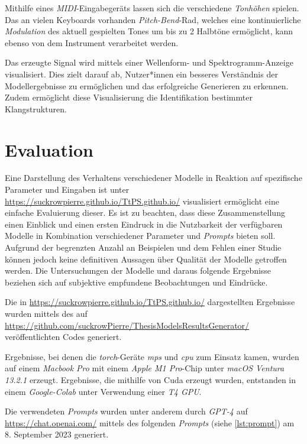 \documentclass[
  a4paper,  %
  twoside,  %
  bibliography=totoc,
  headsepline,
  cleardoublepage=empty,
  parskip=half,
  draft=false
]{scrbook}
\begin{document}
Mithilfe eines \emph{MIDI}-Eingabegeräts lassen sich die verschiedene \emph{Tonhöhen} spielen. Das an vielen Keyboards vorhanden \emph{Pitch-Bend}-Rad, welches eine kontinuierliche \emph{Modulation} des aktuell gespielten Tones um bis zu 2 Halbtöne ermöglicht, kann ebenso von dem Instrument verarbeitet werden. 

Das erzeugte Signal wird mittels einer Wellenform- und Spektrogramm-Anzeige visualisiert. Dies zielt darauf ab, Nutzer*innen ein besseres Verständnis der Modellergebnisse zu ermöglichen und das erfolgreiche Generieren zu erkennen. Zudem ermöglicht diese Visualisierung die Identifikation bestimmter Klangstrukturen.


\section{Evaluation}

Eine Darstellung des Verhaltens verschiedener Modelle in Reaktion auf spezifische Parameter und Eingaben ist unter \url{https://suckrowpierre.github.io/TtPS.github.io/} \cite{pierre-louis_suckrow_text-zu-spielbarem-klang_nodate} visualisiert ermöglicht eine einfache Evaluierung dieser. Es ist zu beachten, dass diese Zusammenstellung einen Einblick und einen ersten Eindruck in die Nutzbarkeit der verfügbaren Modelle in Kombination verschiedener Parameter und \emph{Prompts} bieten soll. Aufgrund der begrenzten Anzahl an Beispielen und dem Fehlen einer Studie können jedoch keine definitiven Aussagen über Qualität der Modelle getroffen werden. Die Untersuchungen der Modelle und daraus folgende Ergebnisse beziehen sich auf subjektive empfundene Beobachtungen und Eindrücke.  

Die in \url{https://suckrowpierre.github.io/TtPS.github.io/} \cite{pierre-louis_suckrow_text-zu-spielbarem-klang_nodate} dargestellten Ergebnisse wurden mittels des auf \url{https://github.com/suckrowPierre/ThesisModelsResultsGenerator/} veröffentlichten Codes generiert.

Ergebnisse, bei denen die \emph{torch}-Geräte \emph{mps} und \emph{cpu} zum Einsatz kamen, wurden auf einem \emph{Macbook Pro} mit einem \emph{Apple M1 Pro}-Chip unter \emph{macOS Ventura 13.2.1} erzeugt. Ergebnisse, die mithilfe von Cuda erzeugt wurden, entstanden in einem \emph{Google-Colab} unter Verwendung einer \emph{T4 GPU}.

Die verwendeten \emph{Prompts} wurden unter anderem durch \emph{GPT-4} \cite{openai_gpt-4_2023} auf \url{https://chat.openai.com/} mittels des folgenden \emph{Prompts} (siehe \ref{lst:prompt}) am 8. September 2023 generiert.
\end{document}

